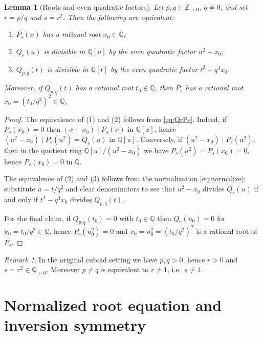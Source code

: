 \documentclass[12pt]{article}
\newtheorem{lemma}{Lemma}
\theoremstyle{remark}
\newtheorem{remark}{Remark}
\theoremstyle{definition}
\begin{document}
\begin{lemma}[Roots and even quadratic factors]\label{lem:14_28}
Let $p,q\in\mathbb{Z}_{>0}$, $q\neq 0$, and set $r=p/q$ and $s=r^2$.
Then the following are equivalent:
\begin{enumerate}
\item $P_s(x)$ has a rational root $x_0\in\mathbb{Q}$;
\item $Q_r(u)$ is divisible in $\mathbb{Q}[u]$ by the even quadratic factor $u^{2}-x_0$;
\item $Q_{p,q}(t)$ is divisible in $\mathbb{Q}[t]$ by the even quadratic factor $t^{2}-q^{4}x_0$.
\end{enumerate}
Moreover, if $Q_{p,q}(t)$ has a rational root $t_0\in\mathbb{Q}$, then $P_s$ has a rational root $x_0=(t_0/q^{2})^{2}\in\mathbb{Q}$.
\end{lemma}

\begin{proof}
The equivalence of (1) and (2) follows from \eqref{eq:QrPs}.
Indeed, if $P_s(x_0)=0$ then $(x-x_0)\mid P_s(x)$ in $\mathbb{Q}[x]$, hence $(u^2-x_0)\mid P_s(u^2)=Q_r(u)$ in $\mathbb{Q}[u]$.
Conversely, if $(u^2-x_0)\mid P_s(u^2)$, then in the quotient ring $\mathbb{Q}[u]/(u^2-x_0)$ we have $P_s(u^2)=P_s(x_0)=0$, hence $P_s(x_0)=0$ in $\mathbb{Q}$.

The equivalence of (2) and (3) follows from the normalization \eqref{eq:normalize}:
substitute $u=t/q^2$ and clear denominators to see that $u^2-x_0$ divides $Q_r(u)$ if and only if $t^2-q^4x_0$ divides $Q_{p,q}(t)$.

For the final claim, if $Q_{p,q}(t_0)=0$ with $t_0\in\mathbb{Q}$ then $Q_r(u_0)=0$ for $u_0=t_0/q^2\in\mathbb{Q}$, hence $P_s(u_0^2)=0$ and $x_0=u_0^2=(t_0/q^2)^2$ is a rational root of $P_s$.
\end{proof}

\begin{remark}\label{rem:domain}
In the original cuboid setting we have $p,q>0$, hence $r>0$ and $s=r^2\in\mathbb{Q}_{>0}$.
Moreover $p\neq q$ is equivalent to $r\neq 1$, i.e.\ $s\neq 1$.
\end{remark}


\section{Normalized root equation and inversion symmetry}\label{sec:involution}
\end{document}
